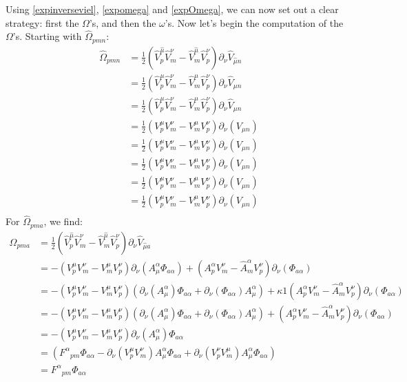 \documentclass{article}
\begin{document}
Using \eqref{expinverseviel}, \eqref{expomega} and \eqref{expOmega}, we can now set out a clear strategy: first the $\Omega$'s, and then the $\omega$'s.
Now let's begin the computation of the $\Omega$'s. Starting with $\hat \Omega_{pmn}$:
\begin{align*}
    \hat \Omega_{pmn} &= \frac{1}{2}(\hat V^{\hat \mu}_{  p} \hat V^{ \nu}_{m}-\hat V^{\hat \mu}_{m} \hat V^{ \nu}_{p})\partial_{ \nu} \hat V_{\hat \mu n}\\
    &= \frac{1}{2}(\hat V^{ \mu}_{  p} \hat V^{ \nu}_{m}-\hat V^{ \mu}_{m} \hat V^{ \nu}_{p})\partial_{ \nu} \hat V_{ \mu n}\\
    &= \frac{1}{2}(\hat V^{ \mu}_{  p} \hat V^{ \nu}_{m}-\hat V^{ \mu}_{m} \hat V^{ \nu}_{p})\partial_{ \nu} \hat V_{ \mu n}\\
    &= \frac{1}{2}(V^{ \mu}_{  p} V^{ \nu}_{m}- V^{ \mu}_{m} V^{ \nu}_{p})\partial_{ \nu} ( V_{ \mu n})\\
    &= \frac{1}{2}(V^{ \mu}_{  p} V^{ \nu}_{m}- V^{ \mu}_{m} V^{ \nu}_{p})\partial_{ \nu}( V_{ \mu n})\\
    &= \frac{1}{2}(V^{ \mu}_{  p} V^{ \nu}_{m}- V^{ \mu}_{m} V^{ \nu}_{p})\partial_{ \nu}( V_{ \mu n})\\
    &= \frac{1}{2}(V^{ \mu}_{  p} V^{ \nu}_{m}- V^{ \mu}_{m} V^{ \nu}_{p})\partial_{ \nu}( V_{ \mu n})\\
    &= \frac{1}{2}(V^{ \mu}_{  p} V^{ \nu}_{m}- V^{ \mu}_{m} V^{ \nu}_{p})\partial_{ \nu}( V_{ \mu n})\\
\end{align*}
For $\hat \Omega_{pma}$, we find:
\begin{align*}
    \hat \Omega_{pma} &= \frac{1}{2}(\hat V^{\hat \mu}_{  p} \hat V^{ \nu}_{m}-\hat V^{\hat \mu}_{m} \hat V^{ \nu}_{p})\partial_{ \nu} \hat V_{\hat \mu a}\\
    &= -( V^{\mu}_{  p}  V^{ \nu}_{m}-  V^{ \mu}_{m} V^{ \nu}_{p})\partial_{ \nu} (A^{\alpha}_{\mu}\Phi_{a\alpha}) + ( A^\alpha_p V^{ \nu}_{m}- \hat A^{\alpha}_{m} V^{ \nu}_{p})\partial_{ \nu} (\Phi_{a\alpha})\\
    &= - (V^{ \mu}_{  p}  V^{ \nu}_{m}- V^{ \mu}_{m}  V^{ \nu}_{p})(\partial_{ \nu} (A^{\alpha}_{\mu})\Phi_{a\alpha}+\partial_{ \nu}(\Phi_{a\alpha})A^{\alpha}_{\mu}) + \kappa 1( A^\alpha_p V^{ \nu}_{m}- \hat A^{\alpha}_{m} V^{ \nu}_{p})\partial_{ \nu} (\Phi_{a\alpha}) \\
    &= - (V^{ \mu}_{  p}  V^{ \nu}_{m}- V^{ \mu}_{m}  V^{ \nu}_{p})(\partial_{ \nu} (A^{\alpha}_{\mu})\Phi_{a\alpha}+\partial_{ \nu}(\Phi_{a\alpha})A^{\alpha}_{\mu}) + (A^\alpha_p V^{ \nu}_{m}- \hat A^{\alpha}_{m} V^{ \nu}_{p})\partial_{ \nu} (\Phi_{a\alpha}) \\
    &= - (V^{ \mu}_{  p}  V^{ \nu}_{m}- V^{ \mu}_{m}  V^{ \nu}_{p})\partial_{ \nu} (A^{\alpha}_{\mu})\Phi_{a\alpha}\\
    &=  (F^\alpha{}_{pm}\Phi_{a\alpha}- \partial_\nu(V^{ \mu}_{  p}  V^{ \nu}_{m})A^{\alpha}_{\mu}\Phi_{a\alpha}+ \partial_\nu(V^{ \nu}_{  p}  V^{ \mu}_{m})A^{\alpha}_{\mu}\Phi_{a\alpha})\\
    &=  F^\alpha{}_{pm}\Phi_{a\alpha}
\end{align*}
\end{document}

